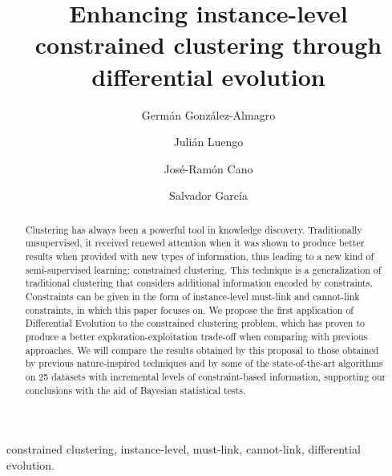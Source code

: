 \documentclass[review]{elsarticle}
\begin{document}
\begin{frontmatter}

\title{Enhancing instance-level constrained clustering through differential evolution}

\author[mymainaddress]{Germ\'an Gonz\'alez-Almagro}

\author[mymainaddress]{Juli\'an Luengo}

\author[mysecondaddress]{Jos\'e-Ram\'on Cano}

\author[mymainaddress]{Salvador Garc\'ia}

\address[mymainaddress]{DaSCI Andalusian Institute of Data Science and Computational Intelligence, University of Granada, Spain}

\address[mysecondaddress]{Dept. of Computer Science, EPS of Linares, University of Ja\'en, Campus Cient\'ifico Tecnol\'ogico de Linares, Cintur\'on Sur S/N, Linares 23700, Ja\'en, Spain}

\begin{abstract}
Clustering has always been a powerful tool in knowledge discovery. Traditionally unsupervised, it received renewed attention when it was shown to produce better results when provided with new types of information, thus leading to a new kind of semi-supervised learning: constrained clustering. This technique is a generalization of traditional clustering that considers additional information encoded by constraints. Constraints can be given in the form of instance-level must-link and cannot-link constraints, in which this paper focuses on. We propose the first application of Differential Evolution to the constrained clustering problem, which has proven to produce a better exploration-exploitation trade-off when comparing with previous approaches. We will compare the results obtained by this proposal to those obtained by previous nature-inspired techniques and by some of the state-of-the-art algorithms on 25 datasets with incremental levels of constraint-based information, supporting our conclusions with the aid of Bayesian statistical tests.
\end{abstract}

\begin{keyword}
constrained clustering, instance-level, must-link, cannot-link, differential evolution.
\end{keyword}

\end{frontmatter}
\end{document}
